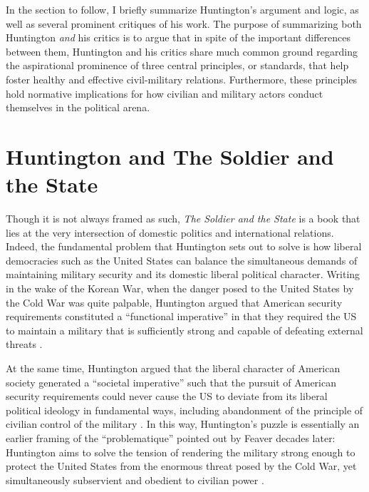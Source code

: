 \documentclass[
  12pt,
  oneside]{memoir}
\begin{document}
In the section to follow, I briefly summarize Huntington's argument and logic, as well as several prominent critiques of his work. The purpose of summarizing both Huntington \emph{and} his critics is to argue that in spite of the important differences between them, Huntington and his critics share much common ground regarding the aspirational prominence of three central principles, or standards, that help foster healthy and effective civil-military relations. Furthermore, these principles hold normative implications for how civilian and military actors conduct themselves in the political arena.

\hypertarget{huntington-and-the-soldier-and-the-state}{%
\section{Huntington and The Soldier and the State}\label{huntington-and-the-soldier-and-the-state}}

Though it is not always framed as such, \emph{The Soldier and the State} is a book that lies at the very intersection of domestic politics and international relations. Indeed, the fundamental problem that Huntington sets out to solve is how liberal democracies such as the United States can balance the simultaneous demands of maintaining military security and its domestic liberal political character. Writing in the wake of the Korean War, when the danger posed to the United States by the Cold War was quite palpable, Huntington argued that American security requirements constituted a ``functional imperative'' in that they required the US to maintain a military that is sufficiently strong and capable of defeating external threats \autocite[1-3]{huntington_soldier_1957}.

At the same time, Huntington argued that the liberal character of American society generated a ``societal imperative'' such that the pursuit of American security requirements could never cause the US to deviate from its liberal political ideology in fundamental ways, including abandonment of the principle of civilian control of the military \autocite[1-3]{huntington_soldier_1957}. In this way, Huntington's puzzle is essentially an earlier framing of the ``problematique'' pointed out by Feaver decades later: Huntington aims to solve the tension of rendering the military strong enough to protect the United States from the enormous threat posed by the Cold War, yet simultaneously subservient and obedient to civilian power \autocite{feaver_civil-military_1996}.
\end{document}
